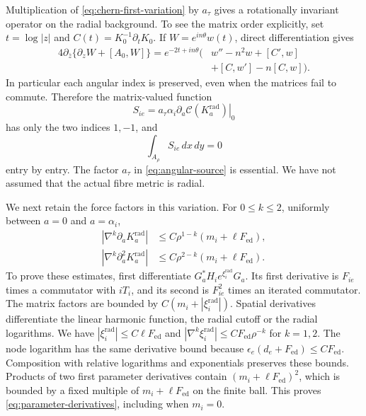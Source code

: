 Multiplication of \eqref{eq:chern-first-variation} by
$a_\tau$ gives a rotationally invariant operator on the radial
background. To see the matrix order explicitly, set
$t=\log|z|$ and $C(t)=K_0^{-1}\partial_tK_0$. If
$W=e^{in\theta}w(t)$, direct differentiation gives
\begin{equation}\label{eq:polar-linearization}
 \begin{split}
 4\partial_{\bar z}\{\partial_zW+[A_0,W]\}
   =e^{-2t+in\theta}\bigl(&w''-n^2w+[C',w]\\
                       &+[C,w']-n[C,w]\bigr).
 \end{split}
\end{equation}
In particular each angular index is preserved, even when the
matrices fail to commute. Therefore the matrix-valued function
\begin{equation}\label{eq:angular-source}
 S_{ie}=a_\tau\alpha_i
       \left.\partial_a\mathcal C(K_a^{\mathrm{rad}})\right|_0
\end{equation}
has only the two indices $1,-1$, and
\begin{equation}\label{eq:zero-mean}
 \int_{A_\rho}S_{ie}\,dx\,dy=0
\end{equation}
entry by entry. The factor $a_\tau$ in
\eqref{eq:angular-source} is essential. We have not assumed
that the actual fibre metric is radial.

We next retain the force factors in this variation. For
$0\le k\le2$, uniformly between $a=0$ and $a=\alpha_i$,
\begin{equation}\label{eq:parameter-derivatives}
 \begin{split}
 |\nabla^k\partial_aK_a^{\mathrm{rad}}|
       &\le C\rho^{1-k}(m_i+\ell F_{\mathrm{ed}}),\\
 |\nabla^k\partial_a^2K_a^{\mathrm{rad}}|
       &\le C\rho^{2-k}(m_i+\ell F_{\mathrm{ed}}).
 \end{split}
\end{equation}
To prove these estimates, first differentiate
$G_a^*H_ie^{\xi_i^{\mathrm{rad}}}G_a$. Its first derivative is
$F_{ie}$ times a commutator with $iT_i$, and its second is
$F_{ie}^2$ times an iterated commutator. The matrix factors are
bounded by $C(m_i+|\xi_i^{\mathrm{rad}}|)$. Spatial derivatives
differentiate the linear harmonic function, the radial cutoff
or the radial logarithms. We have
$|\xi_i^{\mathrm{rad}}|\le C\ell F_{\mathrm{ed}}$ and
$|\nabla^k\xi_i^{\mathrm{rad}}|\le
CF_{\mathrm{ed}}\rho^{-k}$ for $k=1,2$.
The node logarithm has the same derivative bound because
$\epsilon_e(d_e+F_{\mathrm{ed}})\le CF_{\mathrm{ed}}$.
Composition with relative logarithms and exponentials preserves
these bounds. Products of two first parameter derivatives contain
$(m_i+\ell F_{\mathrm{ed}})^2$, which is bounded by a fixed
multiple of $m_i+\ell F_{\mathrm{ed}}$ on the finite ball.
This proves \eqref{eq:parameter-derivatives}, including when
$m_i=0$.


